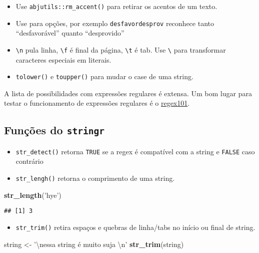 \documentclass[]{book}
\newenvironment{Shaded}{\begin{snugshade}}{\end{snugshade}}
\newcommand{\KeywordTok}[1]{\textcolor[rgb]{0.13,0.29,0.53}{\textbf{{#1}}}}
\newcommand{\CharTok}[1]{\textcolor[rgb]{0.31,0.60,0.02}{{#1}}}
\newcommand{\StringTok}[1]{\textcolor[rgb]{0.31,0.60,0.02}{{#1}}}
\newcommand{\NormalTok}[1]{{#1}}
\providecommand{\tightlist}{%
  \setlength{\itemsep}{0pt}\setlength{\parskip}{0pt}}
\begin{document}
\begin{itemize}
\tightlist
\item
  Use \texttt{abjutils::rm\_accent()} para retirar os acentos de um
  texto.
\item
  Use \texttt{\textbar{}} para opções, por exemplo
  \texttt{desfavor\textbar{}desprov} reconhece tanto ``desfavorável''
  quanto ``desprovido''
\item
  \texttt{\textbackslash{}n} pula linha, \texttt{\textbackslash{}f} é
  final da página, \texttt{\textbackslash{}t} é tab. Use
  \texttt{\textbackslash{}} para transformar caracteres especiais em
  literais.
\item
  \texttt{tolower()} e \texttt{toupper()} para mudar o case de uma
  string.
\end{itemize}

A lista de possibilidades com expressões regulares é extensa. Um bom
lugar para testar o funcionamento de expressões regulares é o
\href{https://regex101.com/}{regex101}.

\subsection{\texorpdfstring{Funções do
\texttt{stringr}}{Funções do stringr}}\label{funcoes-do-stringr}

\begin{itemize}
\item
  \texttt{str\_detect()} retorna \texttt{TRUE} se a regex é compatível
  com a string e \texttt{FALSE} caso contrário
\item
  \texttt{str\_lengh()} retorna o comprimento de uma string.
\end{itemize}

\begin{Shaded}
\begin{Highlighting}[]
\KeywordTok{str_length}\NormalTok{(}\StringTok{'hye'}\NormalTok{)}
\end{Highlighting}
\end{Shaded}

\begin{verbatim}
## [1] 3
\end{verbatim}

\begin{itemize}
\tightlist
\item
  \texttt{str\_trim()} retira espaços e quebras de linha/tabs no início
  ou final de string.
\end{itemize}

\begin{Shaded}
\begin{Highlighting}[]
\NormalTok{string <-}\StringTok{ '}\CharTok{\textbackslash{}n}\StringTok{essa      string é muito suja       }\CharTok{\textbackslash{}n}\StringTok{'}
\KeywordTok{str_trim}\NormalTok{(string)}
\end{Highlighting}
\end{Shaded}
\end{document}
